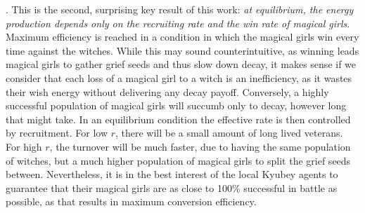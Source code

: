 \documentclass[]{article}
\begin{document}
. This is the second, surprising key result of this work: \textit{at equilibrium, the energy production depends only on the recruiting rate and the win rate of magical girls}. Maximum efficiency is reached in a condition in which the magical girls win every time against the witches. While this may sound counterintuitive, as winning leads magical girls to gather grief seeds and thus slow down decay, it makes sense if we consider that each loss of a magical girl to a witch is an inefficiency, as it wastes their wish energy without delivering any decay payoff. Conversely, a highly successful population of magical girls will succumb only to decay, however long that might take. In an equilibrium condition the effective rate is then controlled by recruitment. For low $r$, there will be a small amount of long lived veterans. For high $r$, the turnover will be much faster, due to having the same population of witches, but a much higher population of magical girls to split the grief seeds between. Nevertheless, it is in the best interest of the local Kyubey agents to guarantee that their magical girls are as close to 100\% successful in battle as possible, as that results in maximum conversion efficiency.



\end{document}

